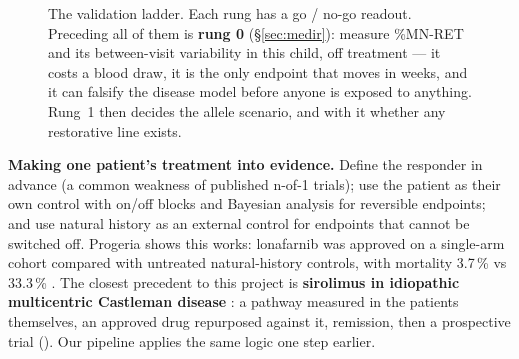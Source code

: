 \documentclass[10pt]{article}
\begin{document}
\begin{figure}[htbp]
\centering
{}
\caption{The validation ladder. Each rung has a go / no-go readout. Preceding all of them is \textbf{rung 0}
(§\ref{sec:medir}): measure \%MN-RET and its between-visit variability in this child, off treatment --- it costs a
blood draw, it is the only endpoint that moves in weeks, and it can falsify the disease model before anyone is
exposed to anything. Rung~1 then decides the allele scenario, and with it whether any restorative line exists.}
\label{fig:escalera}
\end{figure}

\textbf{Making one patient's treatment into evidence.} Define the responder in advance (a common weakness of published
n-of-1 trials); use the patient as their own control with on/off blocks and Bayesian analysis for reversible
endpoints; and use natural history as an external control for endpoints that cannot be switched off. Progeria shows
this works: lonafarnib was approved on a single-arm cohort compared with untreated natural-history controls, with
mortality 3.7\,\% vs 33.3\,\% \citep{gordon}. The closest precedent to this project is \textbf{sirolimus in idiopathic
multicentric Castleman disease} \citep{fajgenbaum}: a pathway measured in the patients themselves, an approved drug
repurposed against it, remission, then a prospective trial (). Our pipeline applies the same logic one
step earlier.
\end{document}
